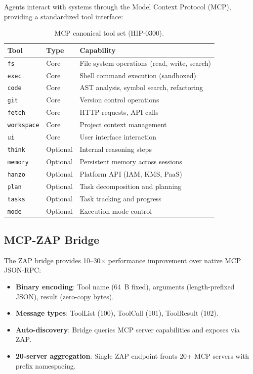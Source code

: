 \documentclass[11pt,letterpaper]{article}
\begin{document}
Agents interact with systems through the Model Context Protocol (MCP), providing a standardized tool interface:

\begin{table}[H]
\centering
\small
\begin{tabular}{@{}llp{4.5cm}@{}}
\toprule
\textbf{Tool} & \textbf{Type} & \textbf{Capability} \\
\midrule
\texttt{fs} & Core & File system operations (read, write, search) \\
\texttt{exec} & Core & Shell command execution (sandboxed) \\
\texttt{code} & Core & AST analysis, symbol search, refactoring \\
\texttt{git} & Core & Version control operations \\
\texttt{fetch} & Core & HTTP requests, API calls \\
\texttt{workspace} & Core & Project context management \\
\texttt{ui} & Core & User interface interaction \\
\texttt{think} & Optional & Internal reasoning steps \\
\texttt{memory} & Optional & Persistent memory across sessions \\
\texttt{hanzo} & Optional & Platform API (IAM, KMS, PaaS) \\
\texttt{plan} & Optional & Task decomposition and planning \\
\texttt{tasks} & Optional & Task tracking and progress \\
\texttt{mode} & Optional & Execution mode control \\
\bottomrule
\end{tabular}
\caption{MCP canonical tool set (HIP-0300).}
\label{tab:mcp-tools}
\end{table}

\subsection{MCP-ZAP Bridge}

The ZAP bridge provides 10--30$\times$ performance improvement over native MCP JSON-RPC:

\begin{itemize}
\item \textbf{Binary encoding}: Tool name (64~B fixed), arguments (length-prefixed JSON), result (zero-copy bytes).
\item \textbf{Message types}: ToolList (100), ToolCall (101), ToolResult (102).
\item \textbf{Auto-discovery}: Bridge queries MCP server capabilities and exposes via ZAP.
\item \textbf{20-server aggregation}: Single ZAP endpoint fronts 20+ MCP servers with prefix namespacing.
\end{itemize}
\end{document}
